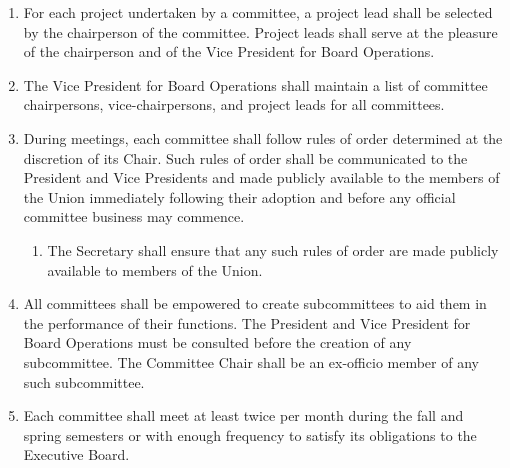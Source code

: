 \begin{enumerate}
  \begin{enumerate}
  \item Any committee member who is not a member of the Executive Board must be approved by the committee chairperson before receiving membership in the committee.
  \item Members of a committee shall serve at the pleasure of the committee chairperson and of the Vice President for Board Operations and may be removed at any time for good cause.
    \begin{enumerate}
    \item Good cause for removal includes, but is not limited to, neglecting the duties of membership, failure to adhere to the rules of order during meetings, or failure to adhere to these Bylaws when conducting business in the name of the committee.
    \item Members are expected to dutifully attend meetings of the committee and complete committee assignments within reasonable deadlines.
    \end{enumerate}
  \end{enumerate}
\item For each project undertaken by a committee, a project lead shall be selected by the chairperson of the committee. Project leads shall serve at the pleasure of the chairperson and of the Vice President for Board Operations.
\item The Vice President for Board Operations shall maintain a list of committee chairpersons, vice-chairpersons, and project leads for all committees.
\item During meetings, each committee shall follow rules of order determined at the discretion of its Chair. Such rules of order shall be communicated to the President and Vice Presidents and made publicly available to the members of the Union immediately following their adoption and before any official committee business may commence.
  \begin{enumerate}
  \item The Secretary shall ensure that any such rules of order are made publicly available to members of the Union.
  \end{enumerate}
\item All committees shall be empowered to create subcommittees to aid them in the performance of their functions. The President and Vice President for Board Operations must be consulted before the creation of any subcommittee. The Committee Chair shall be an ex-officio member of any such subcommittee.
\item Each committee shall meet at least twice per month during the fall and spring semesters or with enough frequency to satisfy its obligations to the Executive Board.

\end{enumerate}
